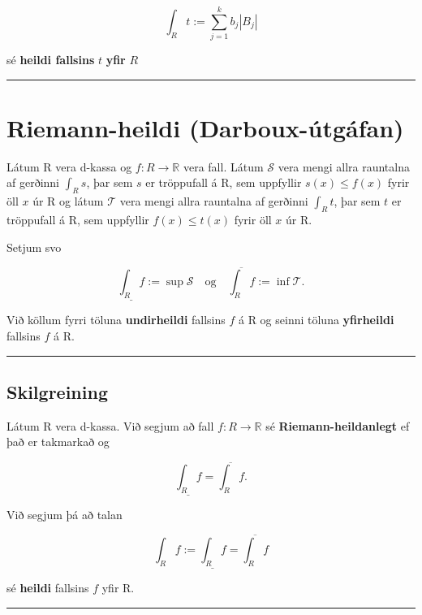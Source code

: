 \documentclass[]{book}
\begin{document}
\[
\int_R t := \sum_{j=1}^k b_j|B_j|
\]

sé \textbf{heildi fallsins} \(t\) \textbf{yfir} \(R\)

\begin{center}\rule{0.5\linewidth}{\linethickness}\end{center}

\hypertarget{riemann-heildi-darboux-utgafan}{%
\chapter{Riemann-heildi (Darboux-útgáfan)}\label{riemann-heildi-darboux-utgafan}}

Látum R vera d-kassa og \(f: R \rightarrow \mathbb R\) vera fall. Látum \(\mathcal S\) vera mengi allra rauntalna af gerðinni \(\int_R s\), þar sem \(s\) er tröppufall á R, sem uppfyllir \(s(x) \leq f(x)\) fyrir öll \(x\) úr R og látum \(\mathcal T\) vera mengi allra rauntalna af gerðinni \(\int_R t\), þar sem \(t\) er tröppufall á R, sem uppfyllir \(f(x) \leq t(x)\) fyrir öll \(x\) úr R.

Setjum svo

\[
\underline{\int_R f}:= \sup \mathcal S \quad \text{og} \quad \overline{\int_R f} := \inf\mathcal T.
\]

Við köllum fyrri töluna \textbf{undirheildi} fallsins \(f\) á R og seinni töluna \textbf{yfirheildi} fallsins \(f\) á R.

\begin{center}\rule{0.5\linewidth}{\linethickness}\end{center}

\hypertarget{skilgreining-3}{%
\section{Skilgreining}\label{skilgreining-3}}

Látum R vera d-kassa. Við segjum að fall \(f: R \rightarrow \mathbb R\) sé \textbf{Riemann-heildanlegt} ef það er takmarkað og

\[
\underline{\int_R f} = \overline{\int_R f}.
\]

Við segjum þá að talan

\[
\int_R f := \underline{\int_R f} = \overline{\int_R f}
\]

sé \textbf{heildi} fallsins \(f\) yfir R.

\begin{center}\rule{0.5\linewidth}{\linethickness}\end{center}
\end{document}
